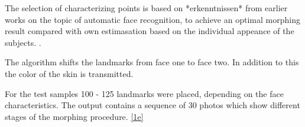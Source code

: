 The selection of characterizing points is based on *erkenntnissen* from earlier works on the topic of automatic face recognition, to achieve an optimal morphing result compared with own estimasation based on the individual appeance of the subjects.  . 

\cite{vukadinovic2005fully}



The algorithm shifts the landmarks from face one to face two. In addition to this the color of the skin is transmitted. 

For the test samples 100 - 125 landmarks were placed, depending on the face characteristics. The output contains a sequence of 30 photos which show different stages of the morphing procedure. \ref{1e}


